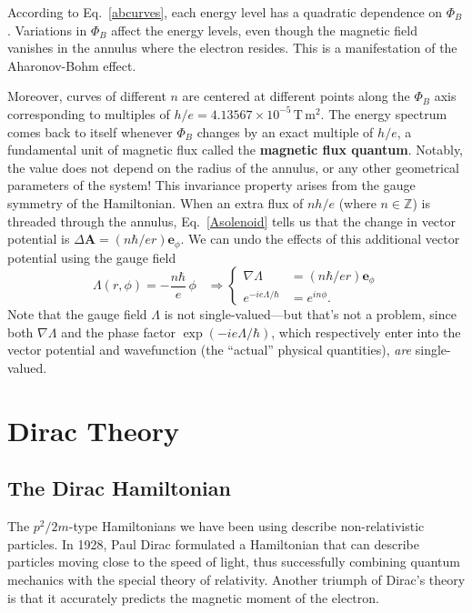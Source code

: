 \documentclass[pra,12pt]{revtex4}
\begin{document}
According to Eq.~\eqref{abcurves}, each energy level has a quadratic
dependence on $\Phi_B$.  Variations in $\Phi_B$ affect the energy
levels, even though the magnetic field vanishes in the annulus where
the electron resides.  This is a manifestation of the Aharonov-Bohm
effect.

Moreover, curves of different $n$ are centered at different points
along the $\Phi_B$ axis corresponding to multiples of $h/e =
4.13567\times10^{-5}\,\mathrm{T}\,\mathrm{m}^2$.  The energy spectrum
comes back to itself whenever $\Phi_B$ changes by an exact multiple of
$h/e$, a fundamental unit of magnetic flux called the \textbf{magnetic
  flux quantum}.  Notably, the value does not depend on the radius of
the annulus, or any other geometrical parameters of the system!  This
invariance property arises from the gauge symmetry of the Hamiltonian.
When an extra flux of $nh/e$ (where $n\in\mathbb{Z}$) is threaded
through the annulus, Eq.~\eqref{Asolenoid} tells us that the change in
vector potential is $\Delta \mathbf{A} = (n\hbar/ e r)
\mathbf{e}_\phi$.  We can undo the effects of this additional vector
potential using the gauge field
\begin{equation}
  \Lambda(r,\phi) = - \frac{n\hbar}{e} \, \phi \;\;\;\Rightarrow
  \begin{cases}\nabla \Lambda &= \displaystyle (n\hbar/er) \mathbf{e}_\phi
    \\ \displaystyle e^{-ie\Lambda/\hbar} &= \displaystyle e^{in\phi}.
  \end{cases}
\end{equation}
Note that the gauge field $\Lambda$ is not single-valued---but that's
not a problem, since both $\nabla\Lambda$ and the phase factor
$\exp(-ie\Lambda/\hbar)$, which respectively enter into the vector
potential and wavefunction (the ``actual'' physical quantities),
\textit{are} single-valued.

\section{Dirac Theory}

\subsection{The Dirac Hamiltonian}
\label{sec:DiracH}

The $p^2/2m$-type Hamiltonians we have been using describe
non-relativistic particles.  In 1928, Paul Dirac formulated a
Hamiltonian that can describe particles moving close to the speed of
light, thus successfully combining quantum mechanics with the special
theory of relativity. Another triumph of Dirac's theory is that it
accurately predicts the magnetic moment of the electron.
\end{document}
